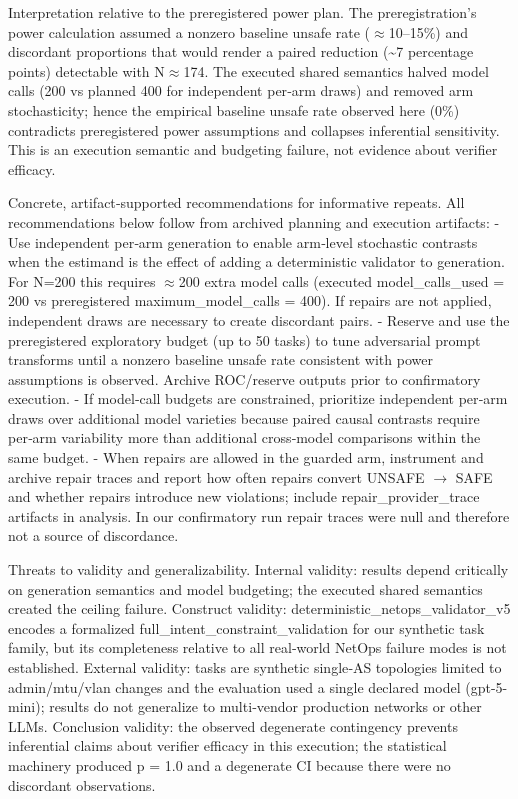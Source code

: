\documentclass[conference]{IEEEtran}
\begin{document}
Interpretation relative to the preregistered power plan. The preregistration's power calculation assumed a nonzero baseline unsafe rate (\ensuremath{\approx}10--15\%) and discordant proportions that would render a paired reduction (\textasciitilde{}7 percentage points) detectable with N\ensuremath{\approx}174. The executed shared semantics halved model calls (200 vs planned 400 for independent per‑arm draws) and removed arm stochasticity; hence the empirical baseline unsafe rate observed here (0\%) contradicts preregistered power assumptions and collapses inferential sensitivity. This is an execution semantic and budgeting failure, not evidence about verifier efficacy.

Concrete, artifact‑supported recommendations for informative repeats. All recommendations below follow from archived planning and execution artifacts:
- Use independent per‑arm generation to enable arm‑level stochastic contrasts when the estimand is the effect of adding a deterministic validator to generation. For N=200 this requires \ensuremath{\approx}200 extra model calls (executed model\_calls\_used = 200 vs preregistered maximum\_model\_calls = 400). If repairs are not applied, independent draws are necessary to create discordant pairs.
- Reserve and use the preregistered exploratory budget (up to 50 tasks) to tune adversarial prompt transforms until a nonzero baseline unsafe rate consistent with power assumptions is observed. Archive ROC/reserve outputs prior to confirmatory execution.
- If model‑call budgets are constrained, prioritize independent per‑arm draws over additional model varieties because paired causal contrasts require per‑arm variability more than additional cross‑model comparisons within the same budget.
- When repairs are allowed in the guarded arm, instrument and archive repair traces and report how often repairs convert UNSAFE \ensuremath{\rightarrow} SAFE and whether repairs introduce new violations; include repair\_provider\_trace artifacts in analysis. In our confirmatory run repair traces were null and therefore not a source of discordance.

Threats to validity and generalizability. Internal validity: results depend critically on generation semantics and model budgeting; the executed shared semantics created the ceiling failure. Construct validity: deterministic\_netops\_validator\_v5 encodes a formalized full\_intent\_constraint\_validation for our synthetic task family, but its completeness relative to all real‑world NetOps failure modes is not established. External validity: tasks are synthetic single‑AS topologies limited to admin/mtu/vlan changes and the evaluation used a single declared model (gpt-5-mini); results do not generalize to multi‑vendor production networks or other LLMs. Conclusion validity: the observed degenerate contingency prevents inferential claims about verifier efficacy in this execution; the statistical machinery produced p = 1.0 and a degenerate CI because there were no discordant observations.
\end{document}
